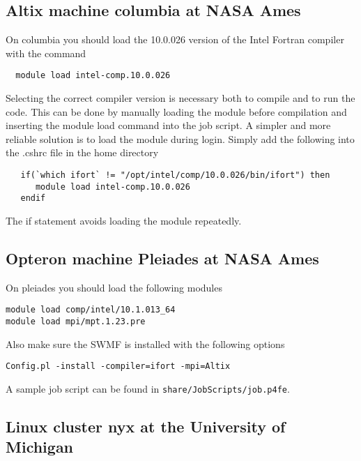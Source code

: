 \subsection{Altix machine columbia at NASA Ames}

On columbia you should load the 10.0.026 version of the Intel Fortran compiler 
with the command
\begin{verbatim}
  module load intel-comp.10.0.026
\end{verbatim}
Selecting the correct compiler version is 
necessary both to compile and to run the code. This can be done
by manually loading the module before compilation and inserting
the module load command into the job script. A simpler and more
reliable solution is to load the module during login. 
Simply add the following into the .cshrc file in the home directory
\begin{verbatim}
   if(`which ifort` != "/opt/intel/comp/10.0.026/bin/ifort") then
      module load intel-comp.10.0.026
   endif
\end{verbatim}
The if statement avoids loading the module repeatedly.

\subsection{Opteron machine Pleiades at NASA Ames}

On pleiades you should load the following modules
\begin{verbatim}
module load comp/intel/10.1.013_64
module load mpi/mpt.1.23.pre
\end{verbatim}

Also make sure the SWMF is installed with the following options
\begin{verbatim}
Config.pl -install -compiler=ifort -mpi=Altix
\end{verbatim}

A sample job script can be found in {\tt share/JobScripts/job.p4fe}.

\subsection{Linux cluster nyx at the University of Michigan}

